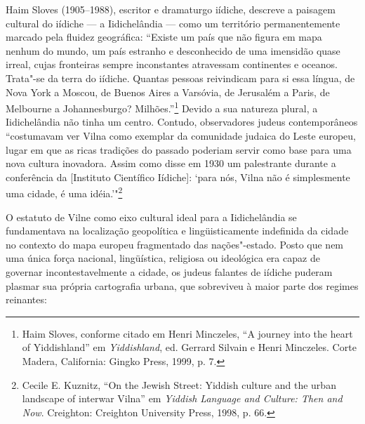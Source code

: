 Haim Sloves (1905--1988), escritor e dramaturgo iídiche, descreve a
paisagem cultural do iídiche --- a Iidichelândia --- como um território
permanentemente marcado pela fluidez geográfica: ``Existe um país que
não figura em mapa nenhum do mundo, um país estranho e desconhecido de
uma imensidão quase irreal, cujas fronteiras sempre inconstantes
atravessam continentes e oceanos. Trata"-se da terra do iídiche. Quantas
pessoas reivindicam para si essa língua, de Nova York a Moscou, de
Buenos Aires a Varsóvia, de Jerusalém a Paris, de Melbourne a
Johannesburgo? Milhões.''\footnote{Haim Sloves, conforme citado em Henri
  Minczeles, ``A journey into the heart of Yiddishland'' em
  \emph{Yiddishland}, ed. Gerrard Silvain e Henri Minczeles. Corte
  Madera, California: Gingko Press, 1999, p. 7.} Devido a sua natureza
plural, a Iidichelândia não tinha um centro. Contudo, observadores
judeus contemporâneos ``costumavam ver Vilna como exemplar da comunidade
judaica do Leste europeu, lugar em que as ricas tradições do passado
poderiam servir como base para uma nova cultura inovadora. Assim como
disse em 1930 um palestrante durante a conferência da  {[}Instituto
Científico Iídiche{]}: `para nós, Vilna não é simplesmente uma cidade, é
uma idéia.'"\footnote{Cecile E. Kuznitz, ``On the Jewish Street:
  Yiddish culture and the urban landscape of interwar Vilna'' em
  \emph{Yiddish Language and Culture: Then and Now}. Creighton:
  Creighton University Press, 1998, p. 66.}

O estatuto de Vilne como eixo cultural ideal para a Iidichelândia se
fundamentava na localização geopolítica e lingüisticamente indefinida da
cidade no contexto do mapa europeu fragmentado das nações"-estado. Posto
que nem uma única força nacional, lingüística, religiosa ou ideológica
era capaz de governar incontestavelmente a cidade, os judeus falantes de
iídiche puderam plasmar sua própria cartografia urbana, que sobreviveu à
maior parte dos regimes reinantes:

